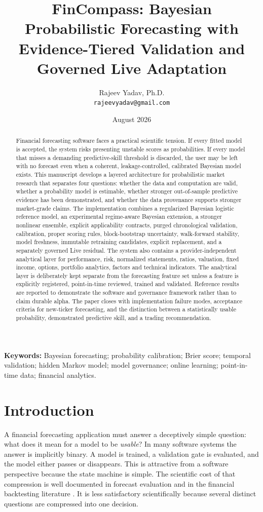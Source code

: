 \documentclass[11pt]{article}
\title{\textbf{FinCompass: Bayesian Probabilistic Forecasting with Evidence-Tiered Validation and Governed Live Adaptation}}
\author{Rajeev Yadav, Ph.D.\\\texttt{rajeevyadav@gmail.com}}
\date{August 2026}
\begin{document}
\maketitle

\begin{abstract}
Financial forecasting software faces a practical scientific tension. If every fitted model is accepted, the system risks presenting unstable scores as probabilities. If every model that misses a demanding predictive-skill threshold is discarded, the user may be left with no forecast even when a coherent, leakage-controlled, calibrated Bayesian model exists. This manuscript develops a layered architecture for probabilistic market research that separates four questions: whether the data and computation are valid, whether a probability model is estimable, whether stronger out-of-sample predictive evidence has been demonstrated, and whether the data provenance supports stronger market-grade claims. The implementation combines a regularized Bayesian logistic reference model, an experimental regime-aware Bayesian extension, a stronger nonlinear ensemble, explicit applicability contracts, purged chronological validation, calibration, proper scoring rules, block-bootstrap uncertainty, walk-forward stability, model freshness, immutable retraining candidates, explicit replacement, and a separately governed Live residual. The system also contains a provider-independent analytical layer for performance, risk, normalized statements, ratios, valuation, fixed income, options, portfolio analytics, factors and technical indicators. The analytical layer is deliberately kept separate from the forecasting feature set unless a feature is explicitly registered, point-in-time reviewed, trained and validated. Reference results are reported to demonstrate the software and governance framework rather than to claim durable alpha. The paper closes with implementation failure modes, acceptance criteria for new-ticker forecasting, and the distinction between a statistically usable probability, demonstrated predictive skill, and a trading recommendation.
\end{abstract}

\noindent\textbf{Keywords:} Bayesian forecasting; probability calibration; Brier score; temporal validation; hidden Markov model; model governance; online learning; point-in-time data; financial analytics.

\section{Introduction}
A financial forecasting application must answer a deceptively simple question: what does it mean for a model to be \emph{usable}? In many software systems the answer is implicitly binary. A model is trained, a validation gate is evaluated, and the model either passes or disappears. This is attractive from a software perspective because the state machine is simple. The scientific cost of that compression is well documented in forecast evaluation and in the financial backtesting literature \citep{gneiting2007proper,white2000reality,bailey2014overfit,bailey2017pbo,harvey2016crosssection}. It is less satisfactory scientifically because several distinct questions are compressed into one decision.
\end{document}
